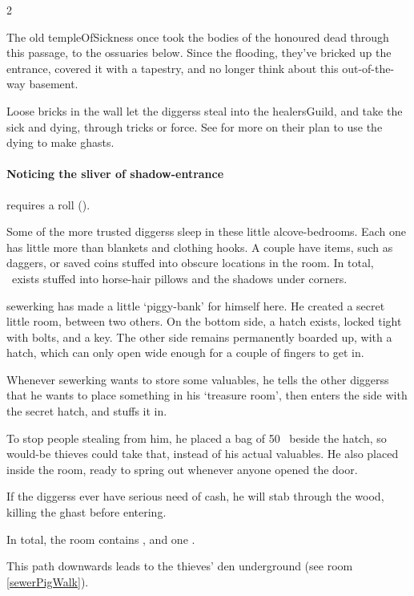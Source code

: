 \begin{multicols}{2}

\begin{exampletext}
  The old \gls{templeOfSickness} once took the bodies of the honoured dead through this passage, to the ossuaries below.
  Since the flooding, they've bricked up the entrance, covered it with a tapestry, and no longer think about this out-of-the-way basement.

\end{exampletext}

Loose bricks in the wall let the \glspl{diggers} steal into the \gls{healersGuild}, and take the sick and dying, through tricks or force.
See  for more on their plan to use the dying to make ghasts.

\paragraph{Noticing the sliver of shadow-entrance}
requires a  roll (\tn[9]).


Some of the more trusted \glspl{diggers} sleep in these little alcove-bedrooms.
Each one has little more than blankets and clothing hooks.
A couple have items, such as daggers, or saved \glspl{coin} stuffed into obscure locations in the room.
In total, \lootMedium\ exists stuffed into horse-hair pillows and the shadows under corners.


\Gls{sewerking} has made a little `piggy-bank' for himself here.
He created a secret little room, between two others.
On the bottom side, a hatch exists, locked tight with bolts, and a key.
The other side remains permanently boarded up, with a hatch, which can only open wide enough for a couple of fingers to get in.

Whenever \gls{sewerking} wants to store some valuables, he tells the other \glspl{diggers} that he wants to place something in his `treasure room', then enters the side with the secret hatch, and stuffs it in.

To stop people stealing from him, he placed a bag of 50~ beside the hatch, so would-be thieves could take that, instead of his actual valuables.
He also placed  inside the room, ready to spring out whenever anyone opened the door.

If the \glspl{diggers} ever have serious need of cash, he will stab through the wood, killing the ghast before entering.


In total, the room contains \lootBig, and one \lootTalisman.

\showTalisman

This path downwards leads to the thieves' den underground (see room \vref{sewerPigWalk}).

\end{multicols}

